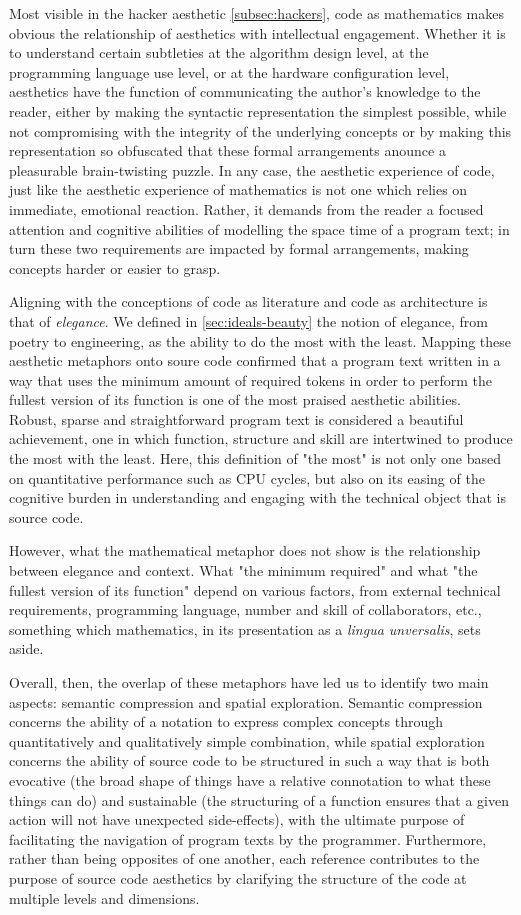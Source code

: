 Most visible in the hacker aesthetic \ref{subsec:hackers}, code as mathematics makes obvious the relationship of aesthetics with intellectual engagement. Whether it is to understand certain subtleties at the algorithm design level, at the programming language use level, or at the hardware configuration level, aesthetics have the function of communicating the author's knowledge to the reader, either by making the syntactic representation the simplest possible, while not compromising with the integrity of the underlying concepts or by making this representation so obfuscated that these formal arrangements anounce a pleasurable brain-twisting puzzle. In any case, the aesthetic experience of code, just like the aesthetic experience of mathematics is not one which relies on immediate, emotional reaction. Rather, it demands from the reader a focused attention and cognitive abilities of modelling the space time of a program text; in turn these two requirements are impacted by formal arrangements, making concepts harder or easier to grasp.

Aligning with the conceptions of code as literature and code as architecture is that of \emph{elegance}. We defined in \ref{sec:ideals-beauty} the notion of elegance, from poetry to engineering, as the ability to do the most with the least. Mapping these aesthetic metaphors onto soure code confirmed that a program text written in a way that uses the minimum amount of required tokens in order to perform the fullest version of its function is one of the most praised aesthetic abilities. Robust, sparse and straightforward program text is considered a beautiful achievement, one in which function, structure and skill are intertwined to produce the most with the least. Here, this definition of "the most" is not only one based on quantitative performance such as CPU cycles, but also on its easing of the cognitive burden in understanding and engaging with the technical object that is source code.

However, what the mathematical metaphor does not show is the relationship between elegance and context. What "the minimum required" and what "the fullest version of its function" depend on various factors, from external technical requirements, programming language, number and skill of collaborators, etc., something which mathematics, in its presentation as a \emph{lingua unversalis}, sets aside.

Overall, then, the overlap of these metaphors have led us to identify two main aspects: semantic compression and spatial exploration. Semantic compression concerns the ability of a notation to express complex concepts through quantitatively and qualitatively simple combination, while spatial exploration concerns the ability of source code to be structured in such a way that is both evocative (the broad shape of things have a relative connotation to what these things can do) and sustainable (the structuring of a function ensures that a given action will not have unexpected side-effects), with the ultimate purpose of facilitating the navigation of program texts by the programmer. Furthermore, rather than being opposites of one another, each reference contributes to the purpose of source code aesthetics by clarifying the structure of the code at multiple levels and dimensions.

